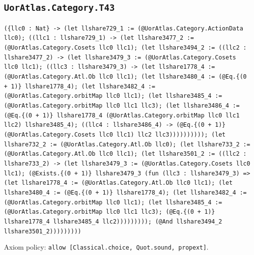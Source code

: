 \documentclass[11pt]{article}
\begin{document}
\subsection*{\texttt{UorAtlas.Category.T43}}
\noindent\texttt{(\{llc0 : Nat\} -> (let llshare729\_1 := (@UorAtlas.Category.ActionData llc0); ((llc1 : llshare729\_1) -> (let llshare3477\_2 := (@UorAtlas.Category.Cosets llc0 llc1); (let llshare3494\_2 := ((llc2 : llshare3477\_2) -> (let llshare3479\_3 := (@UorAtlas.Category.Cosets llc0 llc1); ((llc3 : llshare3479\_3) -> (let llshare1778\_4 := (@UorAtlas.Category.Atl.Ob llc0 llc1); (let llshare3480\_4 := (@Eq.\{(0 + 1)\} llshare1778\_4); (let llshare3482\_4 := (@UorAtlas.Category.orbitMap llc0 llc1); (let llshare3485\_4 := (@UorAtlas.Category.orbitMap llc0 llc1 llc3); (let llshare3486\_4 := (@Eq.\{(0 + 1)\} llshare1778\_4 (@UorAtlas.Category.orbitMap llc0 llc1 llc2) llshare3485\_4); ((llc4 : llshare3486\_4) -> (@Eq.\{(0 + 1)\} (@UorAtlas.Category.Cosets llc0 llc1) llc2 llc3)))))))))); (let llshare732\_2 := (@UorAtlas.Category.Atl.Ob llc0); (let llshare733\_2 := (@UorAtlas.Category.Atl.Ob llc0 llc1); (let llshare3501\_2 := ((llc2 : llshare733\_2) -> (let llshare3479\_3 := (@UorAtlas.Category.Cosets llc0 llc1); (@Exists.\{(0 + 1)\} llshare3479\_3 (fun (llc3 : llshare3479\_3) => (let llshare1778\_4 := (@UorAtlas.Category.Atl.Ob llc0 llc1); (let llshare3480\_4 := (@Eq.\{(0 + 1)\} llshare1778\_4); (let llshare3482\_4 := (@UorAtlas.Category.orbitMap llc0 llc1); (let llshare3485\_4 := (@UorAtlas.Category.orbitMap llc0 llc1 llc3); (@Eq.\{(0 + 1)\} llshare1778\_4 llshare3485\_4 llc2))))))))); (@And llshare3494\_2 llshare3501\_2)))))))))}\par
\noindent Axiom policy: \texttt{allow [Classical.choice, Quot.sound, propext]}.\par
\end{document}
